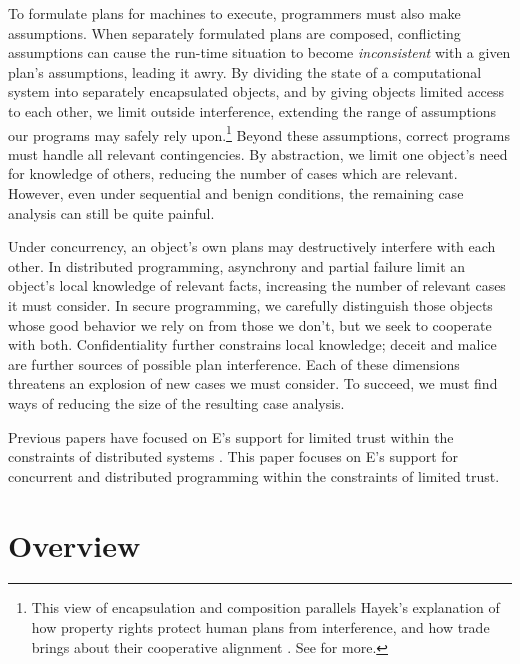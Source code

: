 \documentclass{llncs}
\begin{document}
To formulate plans for machines to execute, programmers must also make
assumptions. When separately formulated plans are composed,
conflicting assumptions can cause the run-time situation to become
\emph{inconsistent} with a given plan's assumptions, leading it
awry. By dividing the state of a computational system into separately
encapsulated objects, and by giving objects limited access to each
other, we limit outside interference, extending the range of
assumptions our programs may safely rely upon.\footnote{
%
This view of encapsulation and composition parallels Hayek's
explanation of how property rights protect human plans from
interference, and how trade brings about their cooperative alignment
\cite{Hayek:1945:UKS}. See \cite{miller:agoric,tulloh:abstraction} for
more.}
%
Beyond these assumptions, correct programs must handle all relevant
contingencies. By abstraction, we limit one object's need for
knowledge of others, reducing the number of cases which are
relevant. However, even under sequential and benign conditions, the
remaining case analysis can still be quite painful.

Under concurrency, an object's own plans may destructively interfere
with each other. In distributed programming, asynchrony and partial
failure limit an object's local knowledge of relevant facts,
increasing the number of relevant cases it must consider. In secure
programming, we carefully distinguish those objects whose good
behavior we rely on from those we don't, but we seek to cooperate with
both. Confidentiality further constrains local knowledge; deceit and
malice are further sources of possible plan interference. Each of
these dimensions threatens an explosion of new cases we must
consider. To succeed, we must find ways of reducing the size of the
resulting case analysis.

Previous papers have focused on E's support for limited trust within
the constraints of distributed systems
\cite{miller:ode,miller:myths,miller:paradigm,miller:struct-auth}. This
paper focuses on E's support for concurrent and distributed
programming within the constraints of limited trust.

\section{Overview}
\end{document}
